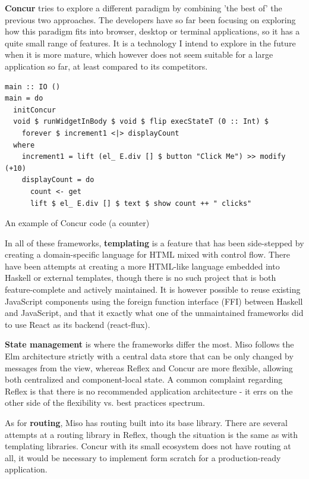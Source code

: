 \documentclass[english,odsaz]{fitthesis}
\begin{document}
\textbf{Concur} \cite{concur} tries to explore a different paradigm by combining 'the best
of' the previous two approaches. The developers have so far been focusing on
exploring how this paradigm fits into browser, desktop or terminal applications,
so it has a quite small range of features. It is a technology I intend to explore
in the future when it is more mature, which however does not seem suitable for a
large application so far, at least compared to its competitors.

\begin{listing}[htbp]
\begin{verbatim}
main :: IO ()
main = do
  initConcur
  void $ runWidgetInBody $ void $ flip execStateT (0 :: Int) $
    forever $ increment1 <|> displayCount
  where
    increment1 = lift (el_ E.div [] $ button "Click Me") >> modify (+10)
    displayCount = do
      count <- get
      lift $ el_ E.div [] $ text $ show count ++ " clicks"
\end{verbatim}
\caption{An example of Concur code (a counter)}
\end{listing}

In all of these frameworks, \textbf{templating} is a feature that has been side-stepped
by creating a domain-specific language for HTML mixed with control flow. There
have been attempts at creating a more HTML-like language embedded into Haskell
or external templates, though there is no such project that is both
feature-complete and actively maintained. It is however possible to reuse
existing JavaScript components using the foreign function interface (FFI)
between Haskell and JavaScript, and that it exactly what one of the unmaintained
frameworks did to use React as its backend (react-flux).

\textbf{State management} is where the frameworks differ the most. Miso follows the Elm
architecture strictly with a central data store that can be only changed by
messages from the view, whereas Reflex and Concur are more flexible, allowing
both centralized and component-local state. A common complaint regarding Reflex
is that there is no recommended application architecture - it errs on the
other side of the flexibility vs. best practices spectrum.

As for \textbf{routing}, Miso has routing built into its base library. There are several
attempts at a routing library in Reflex, though the situation is the same as
with templating libraries. Concur with its small ecosystem does not have routing
at all, it would be necessary to implement form scratch for a production-ready
application.
\end{document}
